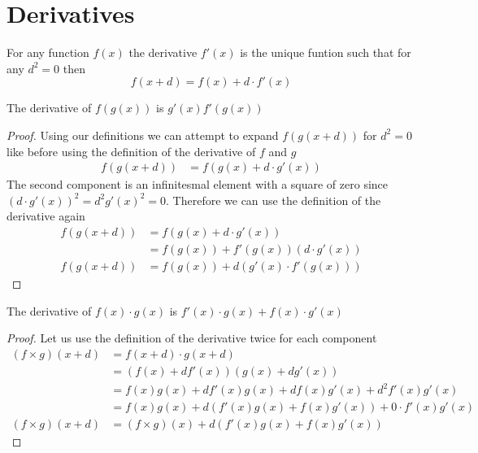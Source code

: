 \section{Derivatives}
\begin{definition}
  For any function $f(x)$ the derivative $f'(x)$ is the unique funtion such that for any $d^2=0$ then
  \begin{equation*}
    f(x+d)=f(x)+d\cdot f'(x)
  \end{equation*}\label{def:derivative}
\end{definition}
\begin{theorem}
  The derivative of $f(g(x))$ is $g'(x)f'(g(x))$
\end{theorem}
\begin{proof}
  Using our definitions we can attempt to expand $f(g(x+d))$ for $d^2=0$ like before using the definition of the derivative of $f$ and $g$
  \begin{align*}
    f(g(x+d))&=f(g(x)+d\cdot g'(x))
  \end{align*}
  The second component is an infinitesmal element with a square of zero since $(d \cdot g'(x))^2=d^2 g'(x)^2=0$. Therefore we can use the definition of the derivative again
  \begin{align*}
    f(g(x+d))&=f(g(x)+d\cdot g'(x)) \\
    &=f(g(x))+f'(g(x)) \left(d\cdot g'(x)\right)\\
    f(g(x+d))&=f(g(x))+d\left(g'(x)\cdot f'(g(x))\right)
  \end{align*}
\end{proof}
\begin{theorem}
  The derivative of $f(x)\cdot g(x)$ is $f'(x)\cdot g(x)+f(x)\cdot g'(x)$
\end{theorem}
\begin{proof}
  Let us use the definition of the derivative twice for each component
  \begin{align*}
    (f\times g)(x+d) &= f(x+d)\cdot g(x+d)\\
     &=\left(f(x)+df'(x)\right)\left(g(x)+dg'(x)\right)\\
    &=f(x)g(x)+df'(x)g(x)+df(x)g'(x)+d^2f'(x)g'(x)\\
    &=f(x)g(x)+d\left(f'(x)g(x)+f(x)g'(x)\right)+0\cdot f'(x)g'(x)\\
    (f\times g)(x+d)&=(f\times g)(x)+d\left(f'(x)g(x)+f(x)g'(x)\right) 
  \end{align*}
\end{proof}
